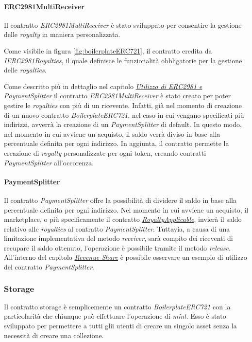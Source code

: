 \paragraph{ERC2981MultiReceiver}
\label{sec:erc2981-multi-receiver}

Il contratto \textit{ERC2981MultiReceiver} è stato sviluppato per consentire la gestione delle \textit{royalty} in maniera personalizzata. 

Come visibile in figura \ref{fig:boilerplateERC721}, il contratto eredita da \textit{IERC2981Royalties}, il quale definisce le funzionalità obbligatorie per la gestione delle \textit{royalties}.

Come descritto più in dettaglio nel capitolo \hyperref[sec:utilizzo-erc2981-payment-splitter]{\textit{Utilizzo di ERC2981 e PaymentSplitter}} il contratto \textit{ERC2981MultiReceiver} è stato creato per poter gestire le \textit{royalties} con più di un ricevente. Infatti, già nel momento di creazione di un nuovo contratto \textit{BoilerplateERC721}, nel caso in cui vengano specificati più indirizzi, avverrà la creazione di un \textit{PaymentSplitter} di default. In questo modo, nel momento in cui avviene un acquisto, il saldo verrà diviso in base alla percentuale definita per ogni indirizzo. In aggiunta, il contratto permette la creazione di \textit{royalty} personalizzate per ogni token, creando contratti \textit{PaymentSplitter} all'occorenza.

\paragraph{PaymentSplitter}

Il contratto \textit{PaymentSplitter} offre la possibilità di dividere il saldo in base alla percentuale definita per ogni indirizzo. Nel momento in cui avviene un acquisto, il marketplace, o più specificamente il contratto \hyperref[sec:marketplace-royalty-applicable]{\textit{RoyaltyApplicable}}, invierà il saldo relativo alle \textit{royalties} al contratto \textit{PaymentSplitter}. Tuttavia, a causa di una limitazione implementativa del metodo \textit{receiver}, sarà compito dei riceventi di recupare il saldo ottenuto, l'operazione è possibile tramite il metodo \textit{release}. All'interno del capitolo \hyperref[sec:revenue-share]{\textit{Revenue Share}} è possibile osservare un esempio di utilizzo del contratto \textit{PaymentSplitter}.

\subsubsection{Storage}
Il contratto storage è semplicemente un contratto \textit{BoilerplateERC721} con la particolarità che chiunque può effettuare l'operazione di \textit{mint}. Esso è stato sviluppato per permettere a tutti glii utenti di creare un singolo asset senza la necessità di creare una collezione. 

